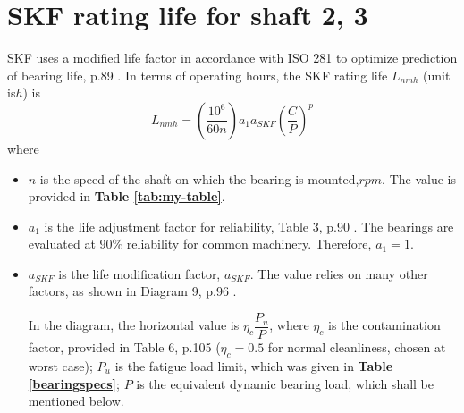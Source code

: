 \section{SKF rating life for shaft 2, 3}
SKF uses a modified life factor in accordance with ISO 281 to optimize prediction of bearing life, p.89 \cite{rolling_bearings}. In terms of operating hours, the SKF rating life $ L_{nmh} $ (unit is$ \unit{h} $) is
\[L_{nmh} = \left(\dfrac{10^6}{60n}\right) a_1 a_{SKF} \left(\dfrac{C}{P}\right)^p\]
where
\begin{itemize}
	\item $ n $ is the speed of the shaft on which the bearing is mounted,$ \unit{rpm} $. The value is provided in \textbf{Table \ref{tab:my-table}}.
	\item $ a_1 $ is the life adjustment factor for reliability, Table 3, p.90 \cite{rolling_bearings}. The bearings are evaluated at $ 90\% $ reliability for common machinery. Therefore, $ a_1 = 1 $.
	\item $ a_{SKF} $ is the life modification factor, $ a_{SKF} $. The value relies on many other factors, as shown in Diagram 9, p.96 \cite{rolling_bearings}.
	
	In the diagram, the horizontal value is $ \eta_c \dfrac{P_u}{P} $, where $ \eta_c $ is the contamination factor, provided in Table 6, p.105 \cite{rolling_bearings} ($ \eta_c = 0.5 $ for normal cleanliness, chosen at worst case); $ P_u $ is the fatigue load limit, which was given in \textbf{Table \ref{bearingspecs}}; $ P $ is the equivalent dynamic bearing load, which shall be mentioned below. 
	

\end{itemize}
